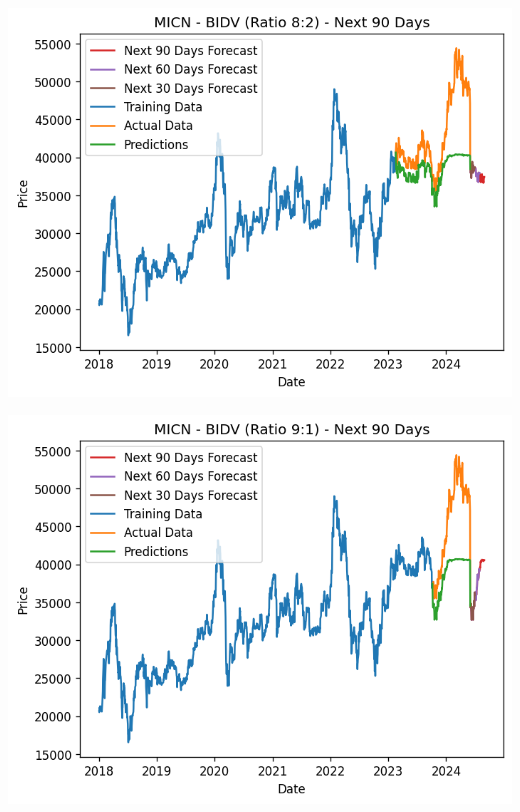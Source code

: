 \documentclass[conference]{IEEEtran}
\begin{document}
\begin{minipage}{0.21\textwidth}
    \centering
    \includegraphics[width=\linewidth]{images/MICN/MICN_BIDV_82.png}
    \label{fig:image1}
\end{minipage}
\hfill
\begin{minipage}{0.21\textwidth}
    \centering
    \includegraphics[width=\linewidth]{images/MICN/MICN_BIDV_91.png}
    \label{fig:image2}
\end{minipage}
\end{document}
